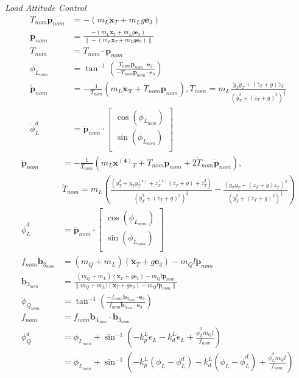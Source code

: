 \documentclass[11pt]{article}
\begin{document}
\emph{Load Attitude Control}
\begin{align*}
T_{nom} \mathbf{p}_{nom} &= - (m_L \mathbf{\ddot{x}}_T + m_L g \mathbf{e}_3) \\
\mathbf{p}_{nom} &= \frac{- (m_L \mathbf{\ddot{x}}_T + m_L g \mathbf{e}_3) } { \| - (m_L \mathbf{\ddot{x}}_T + m_L g \mathbf{e}_3) \| } \\
T_{nom} &= T_{nom} \cdot \mathbf{p}_{nom} \\
\phi_{L_{nom}} &= \tan^{-1} \left( \frac{ T_{nom} \mathbf{p}_{nom} \cdot \mathbf{e}_2 } { - T_{nom} \mathbf{p}_{nom} \cdot \mathbf{e}_3 } \right) \\
\mathbf{\dot{p}}_{nom} &= - \frac{1}{T_{nom}} (m_L \mathbf{\dddot{x}_T} + \dot{T}_{nom} \mathbf{p}_{nom} ), \dot{T}_{nom} = m_L \frac{ \ddot{y}_T \dddot{y}_T + (\ddot{z}_T + g) \dddot{z}_T } { ( \ddot{y}_T^2 + (\ddot{z}_T + g)^2 ) ^{\frac{1}{2}} } \\
\dot{\phi}_L^d &= \mathbf{\dot{p}}_{nom} \cdot
\begin{bmatrix}
       \cos(\phi_{L_{nom}}) \\
       \sin(\phi_{L_{nom}}) \\
\end{bmatrix} 
\end{align*}
\begin{align*}
\mathbf{\ddot{p}}_{nom} &= - \frac{1}{T_{nom}} ( m_L \mathbf{x^{(4)}}_T + \ddot{T}_{nom} \mathbf{p}_{nom} + 2 \dot{T}_{nom} \mathbf{\dot{p}}_{nom} ), \\
& \ddot{T}_{nom} = m_L \left( \frac{ ( \dddot{y}_T^2 + \ddot{y}_T y_T^{(4)} + {z}_T^{(4)} (\ddot{z}_T+g)  + \dddot{z}_T^2 ) } { (\ddot{y}_T^2 + ( \ddot{z}_T+g)^2)^{\frac{1}{2}} } - \frac{ (\ddot{y}_T \dddot{y}_T + (\ddot{z}_T+g) \dddot{z}_T)^2 } { ( \ddot{y}_T^2 + (\ddot{z}_T+g)^2 )^\frac{3}{2} } \right) \\
\ddot{\phi}_{L}^d &= \mathbf{\ddot{p}}_{nom} \cdot 
\begin{bmatrix}
       \cos(\phi_{L_{nom}}) \\
       \sin(\phi_{L_{nom}}) \\
\end{bmatrix}  \\
f_{nom} \mathbf{b}_{3_{nom}} &=  (m_Q + m_L) (\mathbf{\ddot{x}}_T + g \mathbf{e}_3) - m_Q l \mathbf{\ddot{p}}_{nom} \\
\mathbf{b}_{3_{nom}} &= \frac{ (m_Q + m_L) (\mathbf{\ddot{x}}_T + g \mathbf{e}_3) - m_Q l \mathbf{\ddot{p}}_{nom} }{ \| m_Q + m_L) (\mathbf{\ddot{x}}_T + g \mathbf{e}_3) - m_Q l \mathbf{\ddot{p}}_{nom} \| } \\
\phi_{Q_{nom}} &= \tan^{-1} \left( \frac{ - f_{nom} \mathbf{b}_{3_{nom}} \cdot \mathbf{e}_2} { f_{nom} \mathbf{b}_{3_{nom}} \cdot \mathbf{e}_3} \right) \\
f_{nom} &= f_{nom} \mathbf{b}_{3_{nom}} \cdot \mathbf{b}_{3_{nom}} \\
\phi_Q^d &= \phi_{L_{nom}} + \sin^{-1} \left( -k_p^L e_L - k_d^L \dot{e}_L + \frac{ \ddot{\phi}_L^d m_Q l }{f_{nom}}  \right) \\
&= \phi_{L_{nom}} + \sin^{-1} \left( -k_p^L (\phi_L - \phi_L^d) - k_d^L (\dot{\phi}_L - \dot{\phi}_L^d) + \frac{ \ddot{\phi}_L^d m_Q l }{f_{nom}}  \right) 
\end{align*}
\end{document}
